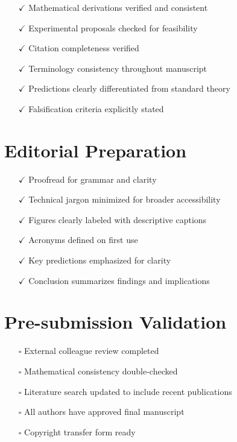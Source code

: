 \documentclass[11pt,letterpaper]{article}
\begin{document}
\begin{itemize}[leftmargin=*]
\item[$\checkmark$] Mathematical derivations verified and consistent
\item[$\checkmark$] Experimental proposals checked for feasibility
\item[$\checkmark$] Citation completeness verified
\item[$\checkmark$] Terminology consistency throughout manuscript
\item[$\checkmark$] Predictions clearly differentiated from standard theory
\item[$\checkmark$] Falsification criteria explicitly stated
\end{itemize}

\section*{Editorial Preparation}

\begin{itemize}[leftmargin=*]
\item[$\checkmark$] Proofread for grammar and clarity
\item[$\checkmark$] Technical jargon minimized for broader accessibility
\item[$\checkmark$] Figures clearly labeled with descriptive captions
\item[$\checkmark$] Acronyms defined on first use
\item[$\checkmark$] Key predictions emphasized for clarity
\item[$\checkmark$] Conclusion summarizes findings and implications
\end{itemize}

\section*{Pre-submission Validation}

\begin{itemize}[leftmargin=*]
\item[$\square$] External colleague review completed
\item[$\square$] Mathematical consistency double-checked
\item[$\square$] Literature search updated to include recent publications
\item[$\square$] All authors have approved final manuscript
\item[$\square$] Copyright transfer form ready
\end{itemize}
\end{document}
